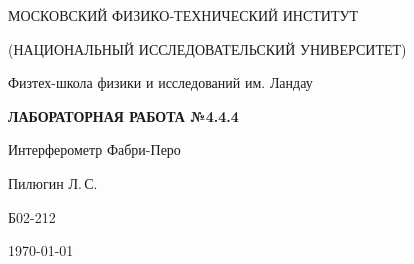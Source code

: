 
\begin{center}
    {
        \MakeUppercase{Московский физико-технический институт}

        \MakeUppercase{(Национальный исследовательский университет)}
    }

    {
        Физтех-школа физики и исследований им. Ландау
    }
    
    \vspace{200pt}
    {
        \Huge
        \bfseries
        \MakeUppercase{Лабораторная работа №4.4.4}
    }

    \vspace{24pt}
    {
        \Large
        Интерферометр Фабри-Перо 
    }

    \vspace{24pt}
    {
        \large
        Пилюгин Л.\,С.

        Б02-212
    }

    \vspace{2pt}
    {
        \large
        \today
    }
\end{center}

\newpage
{}
\setcounter{page}{2}
